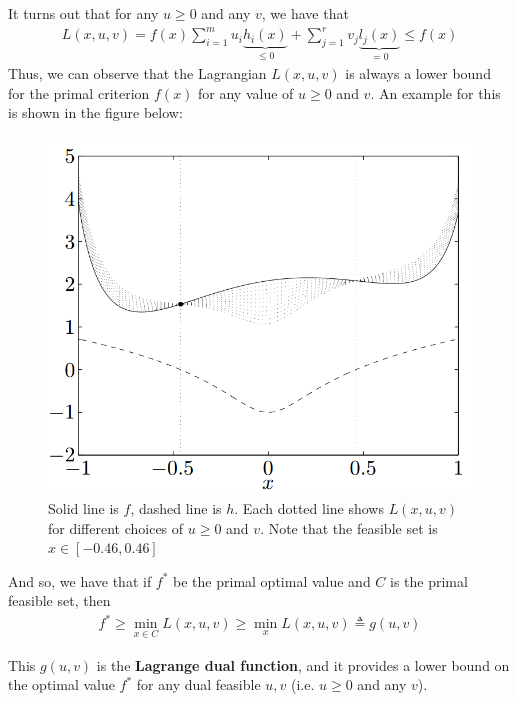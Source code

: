 \documentclass[twoside]{article}
\begin{document}
It turns out that for any $u \geq 0$ and any $v$, we have that
\begin{align*}
L(x, u, v) = f(x) \sum_{i=1}^m u_i \underbrace{h_i(x)}_{\leq 0} + \sum_{j=1}^r v_j \underbrace{l_j(x)}_{=0} \leq f(x)
\end{align*}
Thus, we can observe that the Lagrangian $L(x, u, v)$ is always a lower bound for the primal criterion $f(x)$ for any value of $u \geq 0$ and $v$. An example for this is shown in the figure below:

\begin{figure}[h]
  \centering
  \includegraphics[scale=0.3]{lagrangian.png}
  \caption{Solid line is $f$, dashed line is $h$. Each dotted line shows $L(x,u,v)$ for different choices of $u \geq 0$ and $v$. Note that the feasible set is $x \in [-0.46, 0.46]$}
  \label{fig:lagrangian}
\end{figure}

And so, we have that if $f^*$ be the primal optimal value and $C$ is the primal
feasible set, then
\begin{align*}
f^* \geq \min_{x \in C} L(x, u, v) \geq \min_x L(x, u, v) \triangleq g(u, v)
\end{align*}

This $g(u, v)$ is the \textbf{Lagrange dual function}, and it provides a lower
bound on the optimal value $f^*$ for any dual feasible $u, v$ (i.e. $u \geq 0$
and any $v$).
\end{document}
